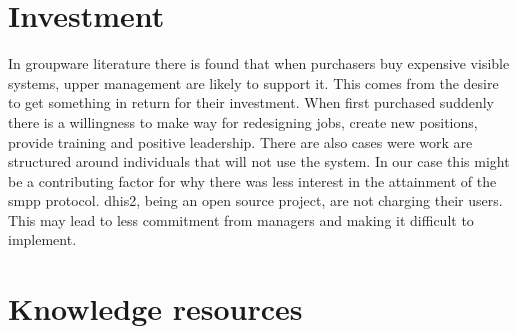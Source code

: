 \section{Investment}
In groupware literature there is found that when purchasers buy expensive visible systems, upper management are likely to support it.
This comes from the desire to get something in return for their investment.
When first purchased suddenly there is a willingness to make way for redesigning jobs, create new positions, provide training and positive leadership. 
There are also cases were work are structured around individuals that will not use the system. 
\cite{groupware:grudin}
In our case this might be a contributing factor for why there was less interest in the attainment of the \gls{smpp} protocol.
\gls{dhis2}, being an open source project, are not charging their users. 
This may lead to less commitment from managers and making it difficult to implement.


\section{Knowledge resources}



